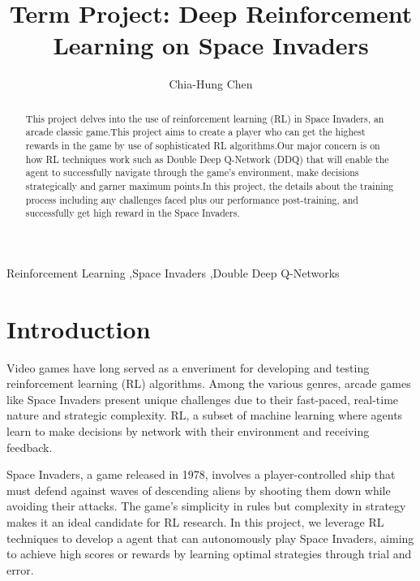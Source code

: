 \documentclass[preprint,12pt,3p,times]{elsarticle}
\begin{document}
\begin{frontmatter}

\title{Term Project: Deep Reinforcement Learning on Space Invaders}

\author[1]{Chia-Hung Chen}


\address[1]{Institute of Applied Mechanics, National Taiwan University, Taipei, Taiwan}



\begin{abstract}
This project delves into the use of reinforcement learning (RL) in Space Invaders, an arcade classic game.This project aims to create a player who can get the highest rewards in the game by use of sophisticated RL algorithms.Our major concern is on how RL techniques work such as Double Deep Q-Network (DDQ) that will enable the agent to successfully navigate through the game’s environment, make decisions strategically and garner maximum points.In this project, the details about the training process including any challenges faced plus our performance post-training, and successfully get high reward in the Space Invaders.
\newline
\end{abstract}

\begin{keyword}
Reinforcement Learning \sep Space Invaders \sep Double Deep Q-Networks
\end{keyword}

\end{frontmatter}

\section{Introduction}
Video games have long served as a enveriment for developing and testing reinforcement learning (RL) algorithms. Among the various genres, arcade games like Space Invaders present unique challenges due to their fast-paced, real-time nature and strategic complexity. RL, a subset of machine learning where agents learn to make decisions by network with their environment and receiving feedback.

Space Invaders, a game released in 1978\cite{GameSpy}, involves a player-controlled ship that must defend against waves of descending aliens by shooting them down while avoiding their attacks. The game's simplicity in rules but complexity in strategy makes it an ideal candidate for RL research. In this project, we leverage RL techniques to develop a agent that can autonomously play Space Invaders, aiming to achieve high scores or rewards by learning optimal strategies through trial and error.
\end{document}
